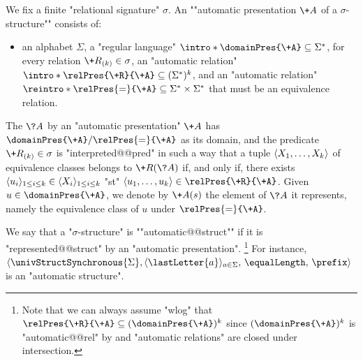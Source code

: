 We fix a finite "relational signature" $\sigma$.
An \AP""automatic presentation $\+A$ of a $\sigma$-structure"" consists of:
\begin{itemize}
	\item an alphabet $\Sigma$,
	\itemAP a "regular language" $\intro*\domainPres{\+A} \subseteq \Sigma^*$,
	\itemAP for every relation $\+R_{(k)} \in \sigma$, an
		"automatic relation" $\intro*\relPres{\+R}{\+A} \subseteq (\Sigma^*)^k$, and
	\itemAP an "automatic relation" $\reintro*\relPres{=}{\+A} \subseteq
		\Sigma^* \times \Sigma^*$ that must be an equivalence relation.%
\end{itemize} 
The \AP{} $\?A$ by an "automatic presentation" $\+A$ has
$\domainPres{\+A}/{\relPres{=}{\+A}}$ as its domain, and the predicate $\+R_{(k)} \in \sigma$
is "interpreted@@pred" in such a way that a tuple $\langle X_1,\dotsc,X_k\rangle$ of equivalence classes
belongs to $\+R(\?A)$ if, and only if, there exists $\langle u_i\rangle_{1 \leq i \leq k} \in\langle X_i\rangle_{1 \leq i \leq k}$ "st" $\tup{u_1,\dotsc,u_k} \in \relPres{\+R}{\+A}$.
Given $u \in \domainPres{\+A}$, we denote by $\+A(s)$ the element of $\?A$ it represents,
namely the equivalence class of $u$ under $\relPres{=}{\+A}$.

We say that a "$\sigma$-structure" is \AP""automatic@@struct"" if it is
"represented@@struct" by an "automatic presentation".%
\footnote{Note that we can always assume "wlog" that $\relPres{\+R}{\+A} \subseteq
(\domainPres{\+A})^k$ since $(\domainPres{\+A})^k$ is "automatic@@rel" by
 and "automatic relations" are closed under intersection.}
For instance, $\langle \univStructSynchronous{\Sigma}, \langle\lastLetter{a}\rangle_{a \in \Sigma},\, \equalLength,\, \prefix \rangle$ is an "automatic structure".

